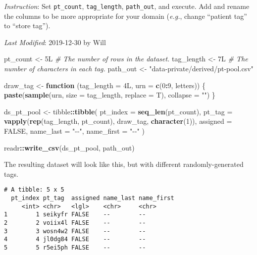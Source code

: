 \documentclass[
]{book}
\newenvironment{Shaded}{\begin{snugshade}}{\end{snugshade}}
\newcommand{\CommentTok}[1]{\textcolor[rgb]{0.56,0.35,0.01}{\textit{#1}}}
\newcommand{\ControlFlowTok}[1]{\textcolor[rgb]{0.13,0.29,0.53}{\textbf{#1}}}
\newcommand{\DataTypeTok}[1]{\textcolor[rgb]{0.13,0.29,0.53}{#1}}
\newcommand{\DecValTok}[1]{\textcolor[rgb]{0.00,0.00,0.81}{#1}}
\newcommand{\KeywordTok}[1]{\textcolor[rgb]{0.13,0.29,0.53}{\textbf{#1}}}
\newcommand{\NormalTok}[1]{#1}
\newcommand{\OperatorTok}[1]{\textcolor[rgb]{0.81,0.36,0.00}{\textbf{#1}}}
\newcommand{\OtherTok}[1]{\textcolor[rgb]{0.56,0.35,0.01}{#1}}
\newcommand{\StringTok}[1]{\textcolor[rgb]{0.31,0.60,0.02}{#1}}
\begin{document}
\emph{Instruction}: Set \texttt{pt\_count}, \texttt{tag\_length}, \texttt{path\_out}, and execute. Add and rename the columns to be more appropriate for your domain (\emph{e.g.}, change ``patient tag'' to ``store tag'').

\emph{Last Modified}: 2019-12-30 by Will

\begin{Shaded}
\begin{Highlighting}[]
\NormalTok{pt\_count    <{-}}\StringTok{ }\NormalTok{5L   }\CommentTok{\# The number of rows in the dataset.}
\NormalTok{tag\_length  <{-}}\StringTok{ }\NormalTok{7L   }\CommentTok{\# The number of characters in each tag.}
\NormalTok{path\_out    <{-}}\StringTok{ "data{-}private/derived/pt{-}pool.csv"}

\NormalTok{draw\_tag <{-}}\StringTok{ }\ControlFlowTok{function}\NormalTok{ (}\DataTypeTok{tag\_length =}\NormalTok{ 4L, }\DataTypeTok{urn =} \KeywordTok{c}\NormalTok{(}\DecValTok{0}\OperatorTok{:}\DecValTok{9}\NormalTok{, letters)) \{}
  \KeywordTok{paste}\NormalTok{(}\KeywordTok{sample}\NormalTok{(urn, }\DataTypeTok{size =}\NormalTok{ tag\_length, }\DataTypeTok{replace =}\NormalTok{ T), }\DataTypeTok{collapse =} \StringTok{""}\NormalTok{)}
\NormalTok{\}}

\NormalTok{ds\_pt\_pool <{-}}\StringTok{ }
\StringTok{  }\NormalTok{tibble}\OperatorTok{::}\KeywordTok{tibble}\NormalTok{(}
    \DataTypeTok{pt\_index    =} \KeywordTok{seq\_len}\NormalTok{(pt\_count),}
    \DataTypeTok{pt\_tag      =} \KeywordTok{vapply}\NormalTok{(}\KeywordTok{rep}\NormalTok{(tag\_length, pt\_count), draw\_tag, }\KeywordTok{character}\NormalTok{(}\DecValTok{1}\NormalTok{)),}
    \DataTypeTok{assigned    =} \OtherTok{FALSE}\NormalTok{,}
    \DataTypeTok{name\_last   =} \StringTok{"{-}{-}"}\NormalTok{,}
    \DataTypeTok{name\_first  =} \StringTok{"{-}{-}"}
\NormalTok{  )}

\NormalTok{readr}\OperatorTok{::}\KeywordTok{write\_csv}\NormalTok{(ds\_pt\_pool, path\_out)}
\end{Highlighting}
\end{Shaded}

The resulting dataset will look like this, but with different randomly-generated tags.

\begin{verbatim}
# A tibble: 5 x 5
  pt_index pt_tag  assigned name_last name_first
     <int> <chr>   <lgl>    <chr>     <chr>     
1        1 seikyfr FALSE    --        --        
2        2 voiix4l FALSE    --        --        
3        3 wosn4w2 FALSE    --        --        
4        4 jl0dg84 FALSE    --        --        
5        5 r5ei5ph FALSE    --        --        
\end{verbatim}
\end{document}
